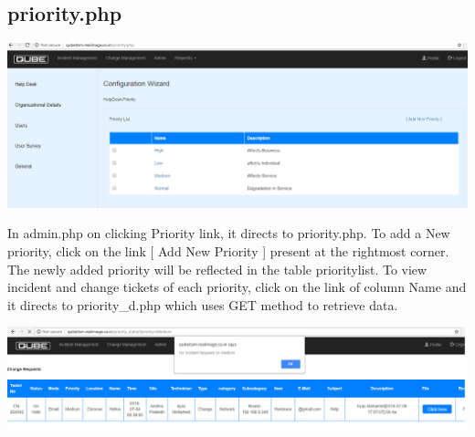 \documentclass{article}
\begin{document}
\subsection{priority.php}
\begin{center}

    \includegraphics[width=7.0in]{priority.png}
   
    \label{}

\end{center}
In admin.php on clicking Priority link, it directs to priority.php. To add a New priority, click on the link [ Add New Priority ] present at the rightmost corner. The newly added priority will be reflected in the table prioritylist. To view incident and change tickets of each priority, click on the link of column Name and it directs to priority\_d.php which uses GET method to retrieve data.
\begin{center}

    \includegraphics[width=7.0in]{priority1.png}
   
    \label{}

\end{center} 
\end{document}
